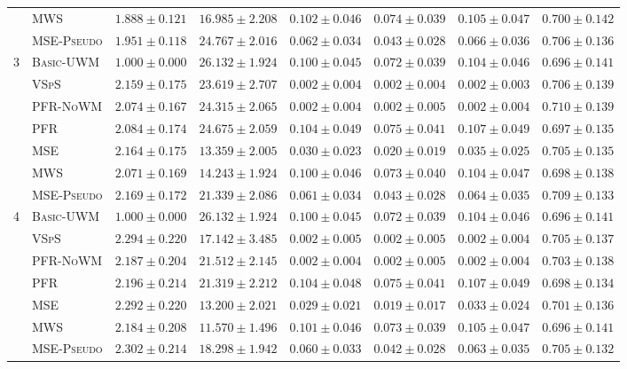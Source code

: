 \begin{table}[!htbp]
{\begin{tabular}{llcccccc}
 & \textsc{MWS} & $1.888 \pm 0.121$ & $16.985 \pm 2.208$ & $0.102 \pm 0.046$ & $0.074 \pm 0.039$ & $0.105 \pm 0.047$ & $0.700 \pm 0.142$ \\
 & \textsc{MSE-Pseudo} & $1.951 \pm 0.118$ & $24.767 \pm 2.016$ & $0.062 \pm 0.034$ & $0.043 \pm 0.028$ & $0.066 \pm 0.036$ & $0.706 \pm 0.136$ \\
\midrule
3 & \textsc{Basic-UWM} & $1.000 \pm 0.000$ & $26.132 \pm 1.924$ & $0.100 \pm 0.045$ & $0.072 \pm 0.039$ & $0.104 \pm 0.046$ & $0.696 \pm 0.141$ \\
 & \textsc{VSpS} & $2.159 \pm 0.175$ & $23.619 \pm 2.707$ & $0.002 \pm 0.004$ & $0.002 \pm 0.004$ & $0.002 \pm 0.003$ & $0.706 \pm 0.139$ \\
 & \textsc{PFR-NoWM} & $2.074 \pm 0.167$ & $24.315 \pm 2.065$ & $0.002 \pm 0.004$ & $0.002 \pm 0.005$ & $0.002 \pm 0.004$ & $0.710 \pm 0.139$ \\
 & \textsc{PFR} & $2.084 \pm 0.174$ & $24.675 \pm 2.059$ & $0.104 \pm 0.049$ & $0.075 \pm 0.041$ & $0.107 \pm 0.049$ & $0.697 \pm 0.135$ \\
 & \textsc{MSE} & $2.164 \pm 0.175$ & $13.359 \pm 2.005$ & $0.030 \pm 0.023$ & $0.020 \pm 0.019$ & $0.035 \pm 0.025$ & $0.705 \pm 0.135$ \\
 & \textsc{MWS} & $2.071 \pm 0.169$ & $14.243 \pm 1.924$ & $0.100 \pm 0.046$ & $0.073 \pm 0.040$ & $0.104 \pm 0.047$ & $0.698 \pm 0.138$ \\
 & \textsc{MSE-Pseudo} & $2.169 \pm 0.172$ & $21.339 \pm 2.086$ & $0.061 \pm 0.034$ & $0.043 \pm 0.028$ & $0.064 \pm 0.035$ & $0.709 \pm 0.133$ \\
\midrule
4 & \textsc{Basic-UWM} & $1.000 \pm 0.000$ & $26.132 \pm 1.924$ & $0.100 \pm 0.045$ & $0.072 \pm 0.039$ & $0.104 \pm 0.046$ & $0.696 \pm 0.141$ \\
 & \textsc{VSpS} & $2.294 \pm 0.220$ & $17.142 \pm 3.485$ & $0.002 \pm 0.005$ & $0.002 \pm 0.005$ & $0.002 \pm 0.004$ & $0.705 \pm 0.137$ \\
 & \textsc{PFR-NoWM} & $2.187 \pm 0.204$ & $21.512 \pm 2.145$ & $0.002 \pm 0.004$ & $0.002 \pm 0.005$ & $0.002 \pm 0.004$ & $0.703 \pm 0.138$ \\
 & \textsc{PFR} & $2.196 \pm 0.214$ & $21.319 \pm 2.212$ & $0.104 \pm 0.048$ & $0.075 \pm 0.041$ & $0.107 \pm 0.049$ & $0.698 \pm 0.134$ \\
 & \textsc{MSE} & $2.292 \pm 0.220$ & $13.200 \pm 2.021$ & $0.029 \pm 0.021$ & $0.019 \pm 0.017$ & $0.033 \pm 0.024$ & $0.701 \pm 0.136$ \\
 & \textsc{MWS} & $2.184 \pm 0.208$ & $11.570 \pm 1.496$ & $0.101 \pm 0.046$ & $0.073 \pm 0.039$ & $0.105 \pm 0.047$ & $0.696 \pm 0.141$ \\
 & \textsc{MSE-Pseudo} & $2.302 \pm 0.214$ & $18.298 \pm 1.942$ & $0.060 \pm 0.033$ & $0.042 \pm 0.028$ & $0.063 \pm 0.035$ & $0.705 \pm 0.132$ \\
\bottomrule
\end{tabular}
}
\end{table}

